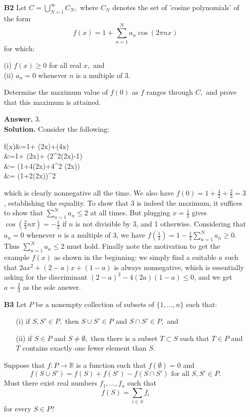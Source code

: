\documentclass[11pt,a4paper]{article}
\newcommand{\<}{\langle}
\renewcommand{\>}{\rangle}
\begin{document}
\begin{enumerate}
	
	\item[\textbf{B2}] Let $C=\bigcup_{N=1}^{\infty}C_N,$ where $C_N$ denotes the set of 'cosine polynomials' of the form \[f(x)=1+\sum_{n=1}^Na_n\cos(2\pi nx)\] for which:
	
	(i) $f(x)\ge 0$ for all real $x,$ and\\
	(ii) $a_n=0$ whenever $n$ is a multiple of $3.$
	
	Determine the maximum value of  $f(0)$ as $f$ ranges through $C,$ and prove that this maximum is attained.
	
	\textbf{Answer.} 3.\\
	\textbf{Solution. }Consider the following:
	\begin{flalign*}
	f(x)&=1+ \cos(2\pi x)+\cos(4\pi x)\\
	&=1+ \cos(2\pi x)+ (2\cos^2(2\pi x)-1)\\
	&= (1+4\cos(2\pi x)+4\cos^2 (2\pi x))\\
	&= (1+2\cos(2\pi x))^2\\
	\end{flalign*}
	which is clearly nonnegative all the time. We also have $f(0)=1+\frac 43+\frac 23=3$, establishing the equality. To show that 3 is indeed the maximum, it suffices to show that $\sum_{n=1}^N a_n\le 2$ at all times. But plugging $x=\frac 13$ gives $\cos(\frac 23 n\pi)=-\frac 12$ if $n$ is not divisible by 3, and 1 otherwise. Considering that $a_n=0$ whenever $n$ is a multiple of 3, we have $f(\frac 13)=1-\frac 12 \sum_{n=1}^N a_n\ge 0.$ Thus $\sum_{n=1}^N a_n\le 2$ must hold. Finally note the motivation to get the example $f(x)$ as shown in the beginning: we simply find a suitable $a$ such that $2ax^2+(2-a)x+(1-a)$ is always nonnegative, which is essentially asking for the discriminant $(2-a)^2-4(2a)(1-a)\le 0$, and we get $a=\frac 23$ as the sole answer. 
	
	\item[\textbf{B3}] Let $P$ be a nonempty collection of subsets of $\{1,\dots,n\}$ such that:
	\begin{itemize}
		\item[(i)] if $S,S'\in P,$ then $S\cup S'\in P$ and $S\cap S'\in P,$ and
		\item [(ii)] if $S\in P$ and $S\ne\emptyset,$ then there is a subset $T\subset S$ such that $T\in P$ and $T$ contains exactly one fewer element than $S.$
	\end{itemize}
	
	Suppose that $f:P\to\mathbb{R}$ is a function such that $f(\emptyset)=0$ and \[f(S\cup S')= f(S)+f(S')-f(S\cap S')\text{ for all }S,S'\in P.\] Must there exist real numbers $f_1,\dots,f_n$ such that \[f(S)=\sum_{i\in S}f_i\] for every $S\in P?$
	

\end{enumerate}
\end{document}
